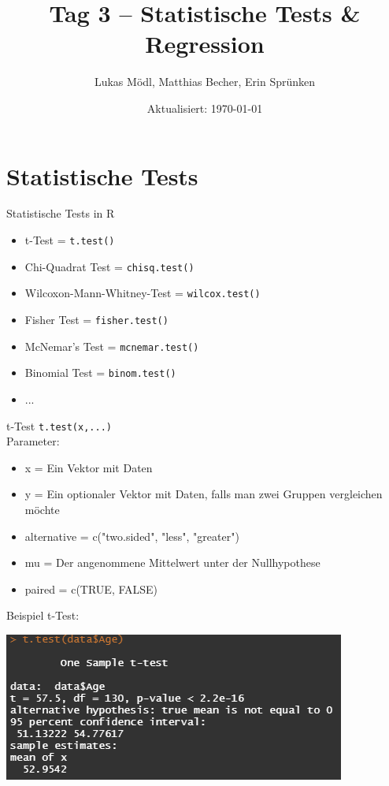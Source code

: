\documentclass[aspectratio = 169]{chariteBeamer}
\author[L. Mödl, M. Becher, E. Sprünken]{Lukas Mödl, Matthias Becher, Erin Sprünken}
\title{Tag 3 -- Statistische Tests \& Regression}
\date[]{Aktualisiert: \today}
\begin{document}

\begin{frame}[plain]
    \titlepage%
\end{frame}
\frame{\tableofcontents}



\section{Statistische Tests}

\begin{frame}[fragile]{Statistische Tests in R}
	\begin{itemize}
		\item t-Test = \verb+t.test()+
		\item Chi-Quadrat Test = \verb+chisq.test()+
		\item Wilcoxon-Mann-Whitney-Test = \verb+wilcox.test()+
		\item Fisher Test = \verb+fisher.test()+
		\item McNemar's Test = \verb+mcnemar.test()+
		\item Binomial Test = \verb+binom.test()+
		\item ...
	\end{itemize}
\end{frame}


\begin{frame}[fragile]{t-Test}
\verb+t.test(x,...)+\\
Parameter:
	\begin{itemize}
		\item x = Ein Vektor mit Daten
		\item y = Ein optionaler Vektor mit Daten, falls man zwei Gruppen vergleichen möchte
		\item alternative = c("two.sided", "less", "greater")
		\item mu = Der angenommene Mittelwert unter der Nullhypothese
		\item paired = c(TRUE, FALSE)
	\end{itemize}
\end{frame}

\begin{frame}[fragile]{Beispiel t-Test:}	
	\begin{center}
		\includegraphics{OneSampleTtest}
	\end{center}
\end{frame}
\end{document}

